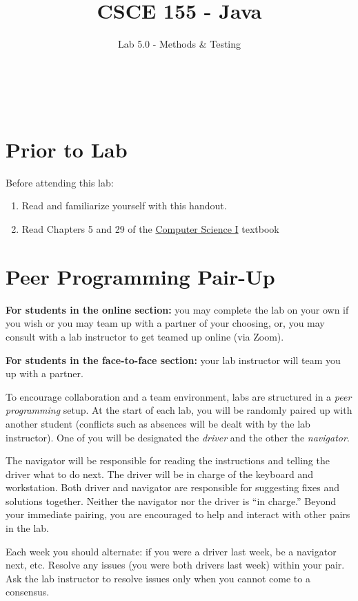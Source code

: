 \documentclass[12pt]{scrartcl}
\title{CSCE 155 - Java}
\subtitle{Lab 5.0 - Methods \& Testing}
\author{~}
\date{~}
\begin{document}
\maketitle

\section*{Prior to Lab}

Before attending this lab:
\begin{enumerate}
  \item Read and familiarize yourself with this handout.
  \item Read Chapters 5 and 29 of the \href{http://cse.unl.edu/~cbourke/ComputerScienceOne.pdf}{Computer Science I} textbook
\end{enumerate}

\section*{Peer Programming Pair-Up}

\textbf{For students in the online section:} you may complete
the lab on your own if you wish or you may team up with a partner
of your choosing, or, you may consult with a lab instructor to get
teamed up online (via Zoom).

\textbf{For students in the face-to-face section:} your
lab instructor will team you up with a partner.  

To encourage collaboration and a team environment, labs are
structured in a \emph{peer programming} setup.  At the start of
each lab, you will be randomly paired up with another student 
(conflicts such as absences will be dealt with by the lab instructor).
One of you will be designated the \emph{driver} and the other
the \emph{navigator}.  

The navigator will be responsible for reading the instructions and
telling the driver what to do next.  The driver will be in charge of the
keyboard and workstation.  Both driver and navigator are responsible
for suggesting fixes and solutions together.  Neither the navigator
nor the driver is ``in charge.''  Beyond your immediate pairing, you
are encouraged to help and interact with other pairs in the lab.

Each week you should alternate: if you were a driver last week, 
be a navigator next, etc.  Resolve any issues (you were both drivers
last week) within your pair.  Ask the lab instructor to resolve issues
only when you cannot come to a consensus.  
\end{document}
